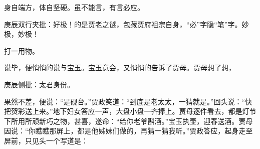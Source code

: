 \begin{parag}


    身自端方，体自坚硬。虽不能言，有言必应。\begin{note}庚辰双行夹批：好极！的是贾老之谜，包藏贾府祖宗自身，“必”字隐“笔”字。妙极，妙极！\end{note}打一用物。
\end{parag}

\begin{parag}

    说毕，便悄悄的说与宝玉。宝玉意会，又悄悄的告诉了贾母。贾母想了想，\begin{note}庚辰侧批：太君身份。\end{note}果然不差，便说：“是砚台。”贾政笑道：“到底是老太太，一猜就是。”回头说：“快把贺彩送上来。”地下妇女答应一声，大盘小盘一齐捧上。贾母逐件看去，都是灯节下所用所顽新巧之物，甚喜，遂命：“给你老爷斟酒。”宝玉执壶，迎春送酒。贾母因说：“你瞧瞧那屏上，都是他姊妹们做的，再猜一猜我听。”贾政答应，起身走至屏前，只见头一个写道是：
\end{parag}


